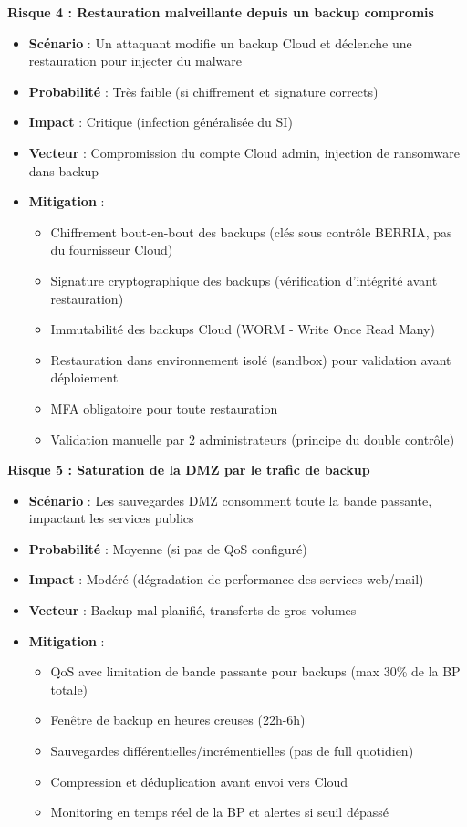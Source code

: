 \medskip

\noindent \textbf{Risque 4 : Restauration malveillante depuis un backup compromis}
\begin{itemize}
  \item \textbf{Scénario} : Un attaquant modifie un backup Cloud et déclenche une restauration pour injecter du malware
  \item \textbf{Probabilité} : Très faible (si chiffrement et signature corrects)
  \item \textbf{Impact} : Critique (infection généralisée du SI)
  \item \textbf{Vecteur} : Compromission du compte Cloud admin, injection de ransomware dans backup
  \item \textbf{Mitigation} :
  \begin{itemize}
    \item Chiffrement bout-en-bout des backups (clés sous contrôle BERRIA, pas du fournisseur Cloud)
    \item Signature cryptographique des backups (vérification d'intégrité avant restauration)
    \item Immutabilité des backups Cloud (WORM - Write Once Read Many)
    \item Restauration dans environnement isolé (sandbox) pour validation avant déploiement
    \item MFA obligatoire pour toute restauration
    \item Validation manuelle par 2 administrateurs (principe du double contrôle)
  \end{itemize}
\end{itemize}

\newpage

\noindent \textbf{Risque 5 : Saturation de la DMZ par le trafic de backup}
\begin{itemize}
  \item \textbf{Scénario} : Les sauvegardes DMZ consomment toute la bande passante, impactant les services publics
  \item \textbf{Probabilité} : Moyenne (si pas de QoS configuré)
  \item \textbf{Impact} : Modéré (dégradation de performance des services web/mail)
  \item \textbf{Vecteur} : Backup mal planifié, transferts de gros volumes
  \item \textbf{Mitigation} :
  \begin{itemize}
    \item QoS avec limitation de bande passante pour backups (max 30\% de la BP totale)
    \item Fenêtre de backup en heures creuses (22h-6h)
    \item Sauvegardes différentielles/incrémentielles (pas de full quotidien)
    \item Compression et déduplication avant envoi vers Cloud
    \item Monitoring en temps réel de la BP et alertes si seuil dépassé
  \end{itemize}
\end{itemize}

